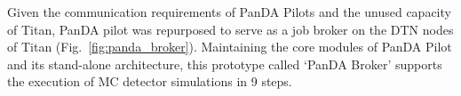 Given the communication requirements of PanDA Pilots and the unused capacity
of Titan, PanDA pilot was repurposed to serve as a job broker on the DTN
nodes of Titan (Fig.~\ref{fig:panda_broker}). Maintaining the core modules of
PanDA Pilot and its stand-alone architecture, this prototype called `PanDA
Broker' 
%
%
%
%
supports the execution of MC detector simulations in 9 steps. 

